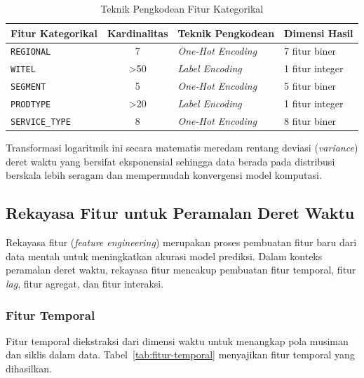 \begin{table}[htbp]
\centering
\caption{Teknik Pengkodean Fitur Kategorikal}
\label{tab:encoding}
\begin{tabular}{|p{3.5cm}|c|p{3cm}|p{3.5cm}|}
\hline
\textbf{Fitur Kategorikal} & \textbf{Kardinalitas} & \textbf{Teknik Pengkodean} & \textbf{Dimensi Hasil} \\
\hline
\texttt{REGIONAL} & 7 & \textit{One-Hot Encoding} & 7 fitur biner \\
\hline
\texttt{WITEL} & >50 & \textit{Label Encoding} & 1 fitur integer \\
\hline
\texttt{SEGMENT} & 5 & \textit{One-Hot Encoding} & 5 fitur biner \\
\hline
\texttt{PRODTYPE} & >20 & \textit{Label Encoding} & 1 fitur integer \\
\hline
\texttt{SERVICE\_TYPE} & 8 & \textit{One-Hot Encoding} & 8 fitur biner \\
\hline
\end{tabular}
\end{table}

Transformasi logaritmik ini secara matematis meredam rentang deviasi (\textit{variance}) deret waktu yang bersifat eksponensial sehingga data berada pada distribusi berskala lebih seragam dan mempermudah konvergensi model komputasi.

\subsection{Rekayasa Fitur untuk Peramalan Deret Waktu}
\label{subsec:feature-engineering}

Rekayasa fitur (\textit{feature engineering}) merupakan proses pembuatan fitur baru dari data mentah untuk meningkatkan akurasi model prediksi. Dalam konteks peramalan deret waktu, rekayasa fitur mencakup pembuatan fitur temporal, fitur \textit{lag}, fitur agregat, dan fitur interaksi.

\subsubsection{Fitur Temporal}

Fitur temporal diekstraksi dari dimensi waktu untuk menangkap pola musiman dan siklis dalam data. Tabel~\ref{tab:fitur-temporal} menyajikan fitur temporal yang dihasilkan.


